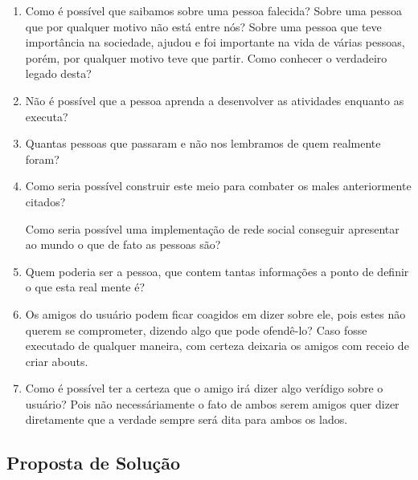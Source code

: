 \begin{enumerate}
    \item Como é possível que saibamos sobre uma pessoa falecida? Sobre uma pessoa que por 
        qualquer motivo não está entre nós? Sobre uma pessoa que teve importância na 
        sociedade, ajudou e foi importante na vida de várias pessoas, porém, por 
        qualquer motivo teve que partir. Como conhecer o verdadeiro legado desta?
    \item Não é possível que a pessoa aprenda a desenvolver as atividades enquanto as executa?
    \item Quantas pessoas que passaram e não nos lembramos de quem realmente foram?
    \item Como seria possível construir este meio para combater os males anteriormente citados?

        Como seria possível uma implementação de rede social conseguir apresentar ao mundo o que
        de fato as pessoas são?
    \item Quem poderia ser a pessoa, que contem tantas informações a ponto de definir o que esta real
mente é?

\item Os amigos do usuário podem ficar coagidos em dizer sobre ele, pois estes não querem se comprometer,
dizendo algo que pode ofendê-lo? Caso fosse executado de qualquer maneira, com certeza deixaria os amigos
com receio de criar abouts.
\item Como é possível ter a certeza que o amigo irá dizer algo verídigo sobre o usuário? Pois não necessáriamente o fato
de ambos serem amigos quer dizer diretamente que a verdade sempre será dita para ambos os lados.
\end{enumerate}


\subsection{Proposta de Solução}
\label{sub:propostadesolucao}

